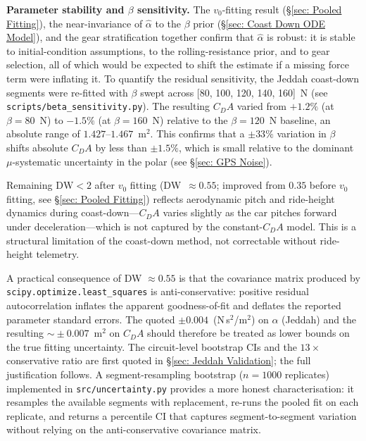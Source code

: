 \textbf{Parameter stability and $\beta$ sensitivity.} The $v_0$-fitting result (\S\ref{sec: Pooled Fitting}), the near-invariance of $\hat{\alpha}$ to the $\beta$ prior (\S\ref{sec: Coast Down ODE Model}), and the gear stratification together confirm that $\hat{\alpha}$ is robust: it is stable to initial-condition assumptions, to the rolling-resistance prior, and to gear selection, all of which would be expected to shift the estimate if a missing force term were inflating it. To quantify the residual sensitivity, the Jeddah coast-down segments were re-fitted with $\beta$ swept across [80, 100, 120, 140, 160]~N (see \texttt{scripts/beta\_sensitivity.py}). The resulting $C_DA$ varied from $+1.2\%$ (at $\beta = 80$~N) to $-1.5\%$ (at $\beta = 160$~N) relative to the $\beta = 120$~N baseline, an absolute range of $1.427$--$1.467$~m$^2$. This confirms that a $\pm 33\%$ variation in $\beta$ shifts absolute $C_DA$ by less than $\pm 1.5\%$, which is small relative to the dominant $\mu$-systematic uncertainty in the polar (see \S\ref{sec: GPS Noise}).

Remaining $\text{DW} < 2$ after $v_0$ fitting (DW~$\approx 0.55$; improved from $0.35$ before $v_0$ fitting, see \S\ref{sec: Pooled Fitting}) reflects aerodynamic pitch and ride-height dynamics during coast-down---$C_DA$ varies slightly as the car pitches forward under deceleration---which is not captured by the constant-$C_DA$ model. This is a structural limitation of the coast-down method, not correctable without ride-height telemetry.

A practical consequence of DW $\approx 0.55$ is that the covariance matrix produced by \texttt{scipy.optimize.least\_squares} is anti-conservative: positive residual autocorrelation inflates the apparent goodness-of-fit and deflates the reported parameter standard errors. The quoted $\pm 0.004$~(N\,s$^2$/m$^2$) on $\alpha$ (Jeddah) and the resulting $\sim\!\pm 0.007$~m$^2$ on $C_DA$ should therefore be treated as lower bounds on the true fitting uncertainty. The circuit-level bootstrap CIs and the $13\times$ conservative ratio are first quoted in \S\ref{sec: Jeddah Validation}; the full justification follows. A segment-resampling bootstrap ($n=1000$ replicates) implemented in \texttt{src/uncertainty.py} provides a more honest characterisation: it resamples the available segments with replacement, re-runs the pooled fit on each replicate, and returns a percentile CI that captures segment-to-segment variation without relying on the anti-conservative covariance matrix. 

